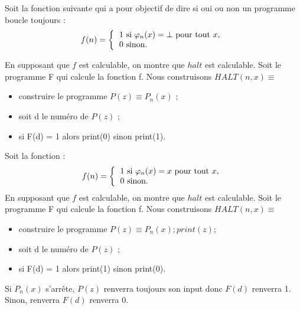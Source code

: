 \begin{myexem}
Soit la fonction suivante qui a pour objectif de dire si oui ou non un programme boucle toujours :
\begin{equation*}
f(n) =\left\{\begin{tabular}{l}
		$1$ si $\varphi_n(x)=\bot$ pour tout $x$,\\
        $0$ sinon.
	\end{tabular}\right.
\end{equation*}

En supposant que $f$ est calculable, on montre que $halt$ est calculable. Soit le programme F qui calcule la fonction f. Nous construisons $ HALT(n,x) \equiv $
		\begin{itemize}
		\item construire le programme $P(z) \equiv P_{n}(x)$ ;
		\item soit d le numéro de $P(z)$ ;
		\item si F(d) = 1 alors print(0) sinon print(1).
		\end{itemize}
\end{myexem}

\begin{myexem}
Soit la fonction :
\begin{equation*}
f(n) =\left\{\begin{tabular}{l}
		$1$ si $\varphi_n(x)=x$ pour tout $x$,\\
        $0$ sinon.
	\end{tabular}\right.
\end{equation*}
En supposant que $f$ est calculable, on montre que $halt$ est calculable. Soit le programme F qui calcule la fonction f. Nous construisons $ HALT(n,x) \equiv $
		\begin{itemize}
		\item construire le programme $P(z) \equiv P_{n}(x); print(z);$
		\item soit d le numéro de $P(z)$ ;
		\item si F(d) = 1 alors print(1) sinon print(0).
		\end{itemize}

Si $P_n(x)$ s'arrête, $P(z)$ renverra toujours son input donc $F(d)$ renverra 1. Sinon, renverra $F(d)$ renverra 0. 
\end{myexem}

